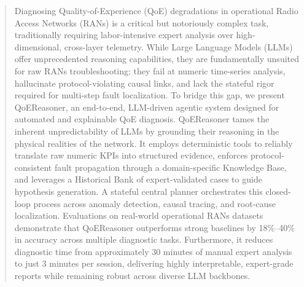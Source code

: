 \documentclass[sigconf,10pt]{acmart} %
\begin{document}
\begin{abstract}
Diagnosing Quality-of-Experience (QoE) degradations in operational Radio Access Networks (RANs) is a critical but notoriously complex task, traditionally requiring labor-intensive expert analysis over high-dimensional, cross-layer telemetry. While Large Language Models (LLMs) offer unprecedented reasoning capabilities, they are fundamentally unsuited for raw RANs troubleshooting: they fail at numeric time-series analysis, hallucinate protocol-violating causal links, and lack the stateful rigor required for multi-step fault localization. To bridge this gap, we present QoEReasoner, an end-to-end, LLM-driven agentic system designed for automated and explainable QoE diagnosis. QoEReasoner tames the inherent unpredictability of LLMs by grounding their reasoning in the physical realities of the network. It employs deterministic tools to reliably translate raw numeric KPIs into structured evidence, enforces protocol-consistent fault propagation through a domain-specific Knowledge Base, and leverages a Historical Bank of expert-validated cases to guide hypothesis generation. A stateful central planner orchestrates this closed-loop process across anomaly detection, causal tracing, and root-cause localization. Evaluations on real-world operational RANs datasets demonstrate that QoEReasoner outperforms strong baselines by 18\%–40\% in  accuracy across multiple diagnostic tasks. Furthermore, it reduces diagnostic time from approximately 30 minutes of manual expert analysis to just 3 minutes per session, delivering highly interpretable, expert-grade reports while remaining robust across diverse LLM backbones.

\end{abstract}
\end{document}
